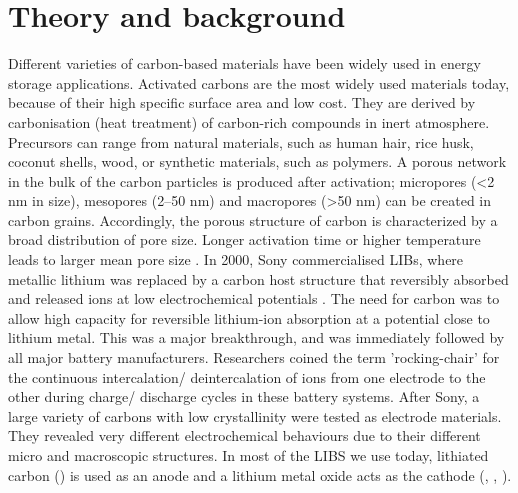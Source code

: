 \section{Theory and background}
Different varieties of carbon-based materials have been widely used in energy storage applications. Activated carbons are the most widely used materials today, because of their high specific surface area and low cost. They are derived by carbonisation (heat treatment) of carbon-rich compounds in inert atmosphere. Precursors can range from natural materials, such as human hair, rice husk, coconut shells, wood, or synthetic materials, such as polymers. A porous network in the bulk of the carbon particles is produced after activation; micropores (<2 nm in size), mesopores (2–50 nm) and macropores (>50 nm) can be created in carbon grains. Accordingly, the porous structure of carbon is characterized by a broad distribution of pore size. Longer activation time or higher temperature leads to larger mean pore size \cite{simon_materials_2008}. In 2000, Sony commercialised LIBs, where metallic lithium was replaced by a carbon host structure that reversibly absorbed and released  ions at low electrochemical potentials \cite{ozawa_lithium-ion_1994}. The need for carbon was to allow high capacity for reversible lithium-ion absorption at a potential close to lithium metal. This was a major breakthrough, and was immediately followed by all major battery manufacturers. Researchers coined the term 'rocking-chair' for the  continuous intercalation/ deintercalation of ions from one electrode to the other during charge/ discharge cycles in these battery systems. After Sony, a large variety of carbons with low crystallinity were tested as electrode materials. They revealed very different electrochemical behaviours due to their different micro and macroscopic structures. In most of the LIBS we use today, lithiated carbon () is used as an anode and a lithium metal oxide acts as the cathode (, , ).   

